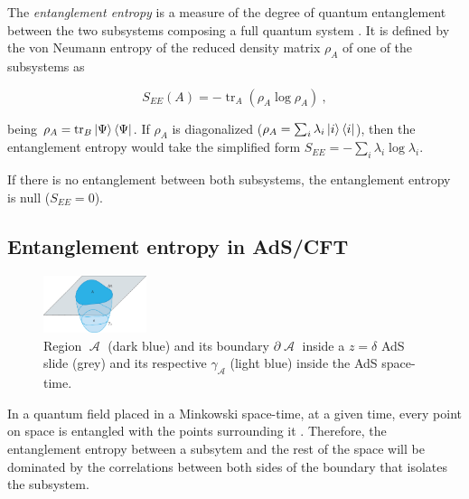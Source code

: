 \documentclass[lettersize,journal]{IEEEtran}
\providecommand{\eq}[2]{
    \begin{equation}
        #2
    \label{eq:#1}
    \end{equation}
}
\DeclareMathOperator{\calA}{\mathcal{A}}
\DeclareMathOperator{\tr}{tr}
\begin{document}
The \textit{entanglement entropy} is a measure of the degree of quantum entanglement between the two subsystems composing a full quantum system \cite{nishioka_entanglement_2018}. It is defined by the von
Neumann entropy of the reduced density matrix $\rho_A$ of one of the subsystems as
\eq{entanglement-entropy}{
    S_{EE}(A) = - \tr_A ( \rho_A \log \rho_A ) \ ,
}
being $\rho_A = \tr_B \ket{\Psi}\bra{\Psi}$. If $\rho_A$ is diagonalized ($\rho_A = \sum_i \lambda_i \ket{i}\bra{i}$), then the entanglement entropy would take the simplified form $S_{EE} = - \sum_i \lambda_i \log \lambda_i$.

If there is no entanglement between both subsystems, the entanglement entropy is null ($S_{EE} = 0$).


\subsection{Entanglement entropy in AdS/CFT}

\begin{figure}
    \centering
    \includegraphics[width=0.27\textwidth]{../../Imatges/EE_AdS-CFT.png}
\caption{Region $\calA$ (dark blue) and its boundary $\partial \calA$ inside a $z=\delta$ AdS slide (grey) and its respective $\gamma_{\calA}$ (light blue) inside the AdS space-time.}
\label{fig:EE_AdS-CFT}
\end{figure}

In a quantum field placed in a Minkowski space-time, at a given time, every point on space is entangled with the points surrounding it \cite{nishioka_entanglement_2018}. Therefore, the entanglement entropy between a subsytem and the rest of the space will be dominated by the correlations between both sides of the boundary that isolates the subsystem.


\end{document}
